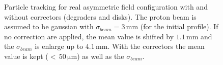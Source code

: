 \begin{figure}[!h]
	\begin{center}
		
	\end{center}
	\caption[Particle tracking for real asymmetric field configuration with and without configuration]{Particle tracking for real asymmetric field configuration with and without correctors (degraders and disks). The proton beam is assumed to be gaussian with $\sigma_{beam}=3\,\mathrm{mm}$ (for the initial profile). If no correction are applied, the mean value is shifted by $1.1\,\mathrm{mm}$ and the $\sigma_{beam}$ is enlarge up to $4.1\,\mathrm{mm}$. With the correctors the mean value is kept ($<\,50\,\mathrm{\mu m}$) as well as the $\sigma_{beam}$.}
	\label{chap3:AsymTransversalProfile}
\end{figure}
